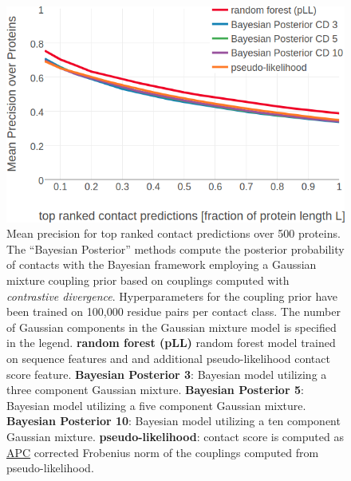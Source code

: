 \documentclass[11pt,a4paper,twoside]{book}
\theoremstyle{definition}
\theoremstyle{definition}
\theoremstyle{remark}
\begin{document}
\begin{figure}

{\centering \includegraphics[width=0.9\linewidth]{img/bayesian_model/benchmark/precision_vs_rank_cd_100k_allcomponents} 

}

\caption{Mean precision for top
ranked contact predictions over 500 proteins. The ``Bayesian Posterior''
methods compute the posterior probability of contacts with the Bayesian
framework employing a Gaussian mixture coupling prior based on couplings
computed with \emph{contrastive divergence}. Hyperparameters for the
coupling prior have been trained on 100,000 residue pairs per contact
class. The number of Gaussian components in the Gaussian mixture model
is specified in the legend. \textbf{random forest (pLL)} random forest
model trained on sequence features and and additional pseudo-likelihood
contact score feature. \textbf{Bayesian Posterior 3}: Bayesian model
utilizing a three component Gaussian mixture. \textbf{Bayesian Posterior
5}: Bayesian model utilizing a five component Gaussian mixture.
\textbf{Bayesian Posterior 10}: Bayesian model utilizing a ten component
Gaussian mixture. \textbf{pseudo-likelihood}: contact score is computed
as \protect\hyperlink{abbrev}{APC} corrected Frobenius norm of the
couplings computed from pseudo-likelihood.}\label{fig:precision-bayesian-model-cd-100k}
\end{figure}
\end{document}
